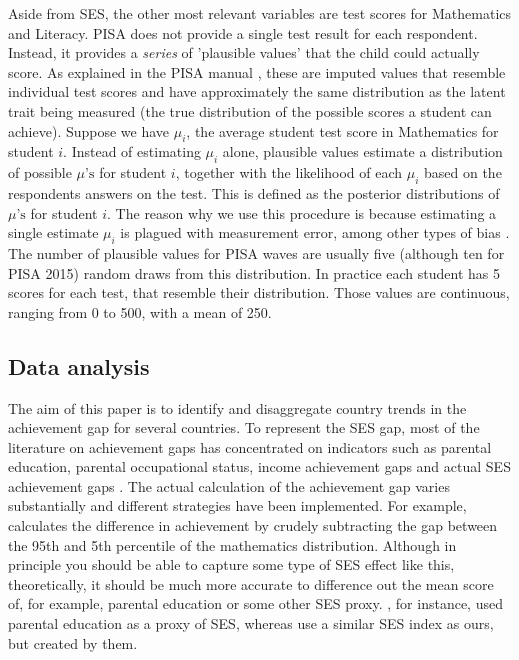 \documentclass[11pt, a4paper]{article}\usepackage[]{graphicx}\usepackage[]{color}
\begin{document}
Aside from SES, the other most relevant variables are test scores for Mathematics and Literacy. PISA does not provide a single test result for each respondent. Instead, it provides a \emph{series} of 'plausible values' that the child could actually score. As explained in the PISA manual \citep{pisa2012_technical}, these are imputed values that resemble individual test scores and have approximately the same distribution as the latent trait being measured (the true distribution of the possible scores a student can achieve). Suppose we have \(\mu_i\), the average student test score in Mathematics for student \(i\). Instead of estimating \(\mu_i\) alone, plausible values estimate a distribution of possible \(\mu\text{'s}\) for student \(i\), together with the likelihood of each \(\mu_i\) based on the respondents answers on the test. This is defined as the posterior distributions of \(\mu\text{'s}\) for student \(i\). The reason why we use this procedure is because estimating a single estimate \(\mu_i\) is plagued with measurement error, among other types of bias \citep[see][]{wu2005}. The number of plausible values for PISA waves are usually five (although ten for PISA 2015) random draws from this distribution. In practice each student has 5 scores for each test, that resemble their distribution. Those values are continuous, ranging from 0 to 500, with a mean of 250.

\subsection{Data analysis}

The aim of this paper is to identify and disaggregate country trends in the achievement gap for several countries. To represent the SES gap, most of the literature on achievement gaps has concentrated on indicators such as parental education, parental occupational status, income achievement gaps and actual SES achievement gaps \citep{fryer2004, hanushek_woesmann_tracking, saw2016, bradbury2015, byun2010}. The actual calculation of the achievement gap varies substantially and different strategies have been implemented. For example, \citet{micklewright} calculates the difference in achievement by crudely subtracting the gap between the 95th and 5th percentile of the mathematics distribution. Although in principle you should be able to capture some type of SES effect like this, theoretically, it should be much more accurate to difference out the mean score of, for example, parental education or some other SES proxy. \citet{saw2016}, for instance, used parental education as a proxy of SES, whereas \citet{byun2010} use a similar SES index as ours, but created by them.
\end{document}
